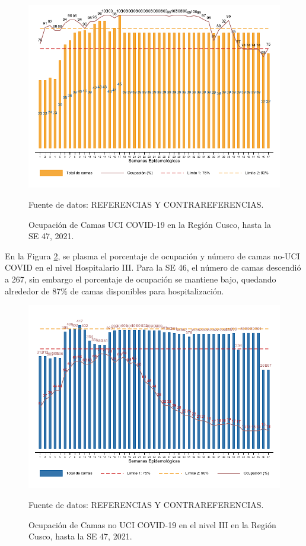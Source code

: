 \documentclass[12pt,a4paper,openany]{book}
\begin{document}
\begin{figure}[h]
	\caption{Ocupación de Camas UCI COVID-19 en la Región Cusco, hasta la SE 47, 2021.}\label{fig:ocupacion_uci}
	\begin{center}
		\includegraphics[width=0.95\linewidth]{../figuras/uci.pdf}
	\end{center}
	{\footnotesize {Fuente de datos: REFERENCIAS Y CONTRAREFERENCIAS.}}
\end{figure}
\cleardoublepage

En la Figura \ref{fig:ocupacion_3_nivel}, se plasma el porcentaje de ocupación y número de camas no-UCI COVID en el nivel Hospitalario III. Para la SE 46, el número de camas descendió a 267, sin embargo el porcentaje de ocupación se mantiene bajo, quedando alrededor de 87$\%$ de camas disponibles para hospitalización. 
  
\begin{figure}[htpb]
	\caption{Ocupación de Camas no UCI COVID-19 en el nivel III en la Región Cusco, hasta la SE 47, 2021.}\label{fig:ocupacion_3_nivel}
	\begin{center}
		\includegraphics[width=0.95\linewidth]{../figuras/nivel_3.pdf}
	\end{center}
	{\footnotesize {Fuente de datos: REFERENCIAS Y CONTRAREFERENCIAS.}}
\end{figure}
\end{document}
